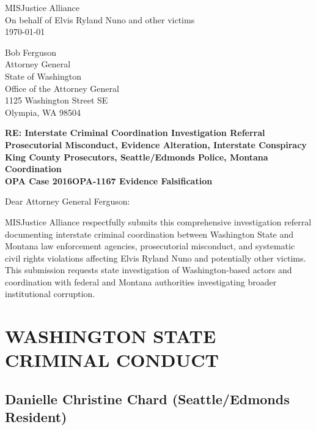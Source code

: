\documentclass[12pt,oneside]{article}
\begin{document}
\begin{flushleft}

MISJustice Alliance \\
On behalf of Elvis Ryland Nuno and other victims \\
\today

\vspace{0.3in}

Bob Ferguson \\
Attorney General \\
State of Washington \\
Office of the Attorney General \\
1125 Washington Street SE \\
Olympia, WA 98504

\vspace{0.3in}

\textbf{RE: Interstate Criminal Coordination Investigation Referral} \\
\textbf{Prosecutorial Misconduct, Evidence Alteration, Interstate Conspiracy} \\
\textbf{King County Prosecutors, Seattle/Edmonds Police, Montana Coordination} \\
\textbf{OPA Case 2016OPA-1167 Evidence Falsification}

\vspace{0.3in}

Dear Attorney General Ferguson:

\vspace{0.2in}

MISJustice Alliance respectfully submits this comprehensive investigation referral documenting interstate criminal coordination between Washington State and Montana law enforcement agencies, prosecutorial misconduct, and systematic civil rights violations affecting Elvis Ryland Nuno and potentially other victims. This submission requests state investigation of Washington-based actors and coordination with federal and Montana authorities investigating broader institutional corruption.

\section*{WASHINGTON STATE CRIMINAL CONDUCT}

\subsection*{Danielle Christine Chard (Seattle/Edmonds Resident)}


\end{flushleft}
\end{document}
